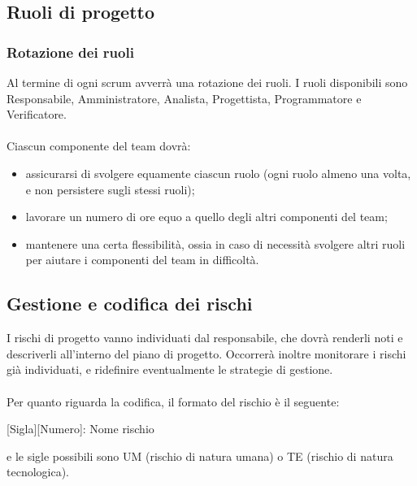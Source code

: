 \subsection{Ruoli di progetto}
\subsubsection{Rotazione dei ruoli}
Al termine di ogni scrum avverrà una rotazione dei ruoli. I ruoli disponibili sono Responsabile, Amministratore, Analista, Progettista, Programmatore e Verificatore.
\\\\
Ciascun componente del team dovrà:
\begin{itemize}
\setlength\itemsep{0.1em}
    \item assicurarsi di svolgere equamente ciascun ruolo (ogni ruolo almeno una volta, e non persistere sugli stessi ruoli);
    \item lavorare un numero di ore equo a quello degli altri componenti del team;
    \item mantenere una certa flessibilità, ossia in caso di necessità svolgere altri ruoli per aiutare i componenti del team in difficoltà.
\end{itemize}

\subsection{Gestione e codifica dei rischi}
I rischi di progetto vanno individuati dal responsabile, che dovrà renderli noti e descriverli all'interno del piano di progetto. Occorrerà inoltre monitorare i rischi già individuati, e ridefinire eventualmente le strategie di gestione.
\\\\
Per quanto riguarda la codifica, il formato del rischio è il seguente:
\begin{center}
    [Sigla][Numero]: Nome rischio
\end{center}
e le sigle possibili sono UM (rischio di natura umana) o TE (rischio di natura tecnologica).